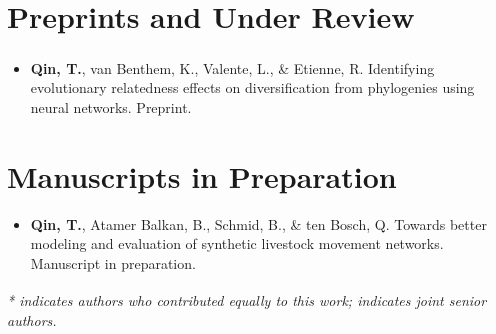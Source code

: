 \section*{Preprints and Under Review}

\begin{itemize}
  \item \textbf{Qin, T.}, van Benthem, K., Valente, L.\textsuperscript{\dag}, \& Etienne, R.\textsuperscript{\dag}
        Identifying evolutionary relatedness effects on diversification from phylogenies using neural networks. Preprint.
\end{itemize}

\section*{Manuscripts in Preparation}

\begin{itemize}
  \item \textbf{Qin, T.}, Atamer Balkan, B., Schmid, B., \& ten Bosch, Q.
        Towards better modeling and evaluation of synthetic livestock movement networks.
        Manuscript in preparation.
\end{itemize}

\noindent\textit{* indicates authors who contributed equally to this work; \textsuperscript{\dag} indicates joint senior authors.}

